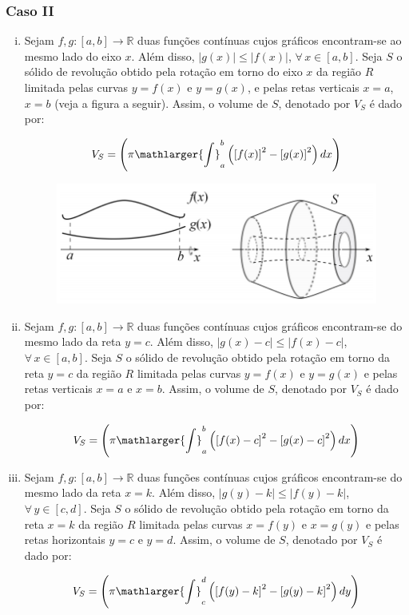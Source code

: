 \cleardoublepage\documentclass[../main.tex]{subfiles}
\begin{document}
\subsubsection*{Caso II}
\begin{enumerate}[i.]
    \item Sejam \(f, g:[a,b] \to \mathbb{R}\) duas funções contínuas cujos gráficos encontram-se ao mesmo lado do eixo \(x\). Além disso, \(|g(x)| \leq |f(x)|\), \(\forall\,x\in [a,b]\). Seja \(S\) o sólido de revolução obtido pela rotação em torno do eixo \(x\) da região \(R\) limitada pelas curvas \(y=f(x)\) e \(y=g(x)\), e pelas retas verticais \(x=a\), \(x=b\) (veja a figura a seguir). Assim, o volume de \(S\), denotado por \(V_S\) é dado por:

\[ V_S= \left( \pi \mathlarger{\int}^{b}_{a}\left( \left[ f(x)\right]^2 - \left[ g(x)\right]^2 \right)dx \right) \]
    \begin{figure}[H]
    \centering
    \includegraphics{figs/Volume/SolidoRevCaso2.png}
    \caption{}
\end{figure}
\item Sejam \(f, g:[a,b] \to \mathbb{R}\) duas funções contínuas cujos gráficos encontram-se do mesmo lado da reta \(y=c\). Além disso, \(|g(x)-c| \leq |f(x)-c|\), \(\forall\,x\in [a,b]\). Seja \(S\) o sólido de revolução obtido pela rotação em torno da reta \(y=c\) da região \(R\) limitada pelas curvas \(y=f(x)\) e \(y=g(x)\) e pelas retas verticais \(x=a\) e \(x=b\). Assim, o volume de \(S\), denotado por \(V_S\) é dado por:

\[ V_S= \left( \pi \mathlarger{\int}^{b}_{a}\left( \left[ f(x)-c\right]^2 - \left[ g(x)-c\right]^2 \right)dx \right) \]
\item Sejam \(f, g:[a,b] \to \mathbb{R}\) duas funções contínuas cujos gráficos encontram-se do mesmo lado da reta \(x=k\). Além disso, \(|g(y)-k| \leq |f(y)-k|\), \(\forall\,y\in [c,d]\). Seja \(S\) o sólido de revolução obtido pela rotação em torno da reta \(x=k\) da região \(R\) limitada pelas curvas \(x=f(y)\) e \(x=g(y)\) e pelas retas horizontais \(y=c\) e \(y=d\). Assim, o volume de \(S\), denotado por \(V_S\) é dado por:

\[ V_S= \left( \pi \mathlarger{\int}^{d}_{c}\left( \left[ f(y)-k\right]^2 - \left[ g(y)-k\right]^2 \right)dy \right) \]
    \end{enumerate}
\end{document}
